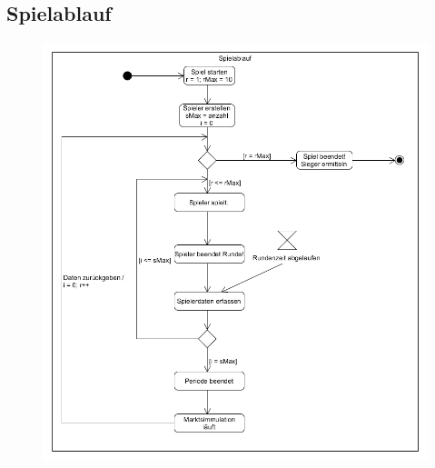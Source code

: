 \subsection{Spielablauf}
\begin{figure} [!h]
	\centering
	\includegraphics[scale=0.5]{img/Spielablauf.png} 
\end{figure}





